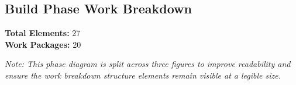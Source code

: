 
\subsection{Build Phase Work Breakdown}

\noindent\textbf{Total Elements:} 27
\\\textbf{Work Packages:} 20

\vspace{0.5em}

\noindent\textit{Note: This phase diagram is split across three figures to improve readability and ensure the work breakdown structure elements remain visible at a legible size.}



\newpage


\newpage


